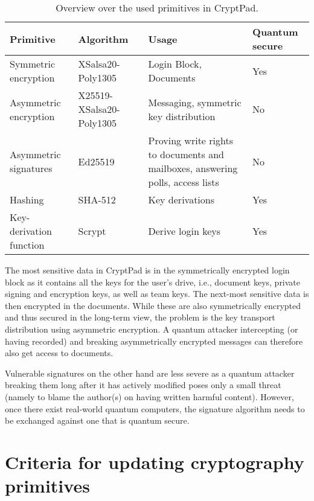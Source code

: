 \documentclass[a4paper, 11pt]{article}
\begin{document}
\begin{table}[t]
  \centering
  \caption{Overview over the used primitives in CryptPad.}
  \label{tab:overview}

  \begin{tabular}{@{}lp{1.5cm}p{3.7cm}p{1.6cm}@{}}
    \toprule
    Primitive & Algorithm & Usage & Quantum secure~\cite{Carames2020} \\
    \midrule
    Symmetric encryption    &  XSalsa20-Poly1305        & Login Block, Documents &Yes \\
    Asymmetric encryption                 & X25519-XSalsa20-Poly1305  & Messaging, symmetric key distribution            & No\\
    Asymmetric signatures                 & Ed25519                   & Proving write rights to documents and mailboxes, answering polls, access lists& No \\
    Hashing                               & SHA-512                   & Key derivations & Yes \\
    Key-derivation function         & Scrypt                    & Derive login keys & Yes \\
    \bottomrule
  \end{tabular}
\end{table}

The most sensitive data in CryptPad is in the symmetrically encrypted login block as it contains all the keys for the user's drive, i.e., document keys, private signing and encryption keys, as well as team keys.
The next-most sensitive data is then encrypted in the documents.
While these are also symmetrically encrypted and thus secured in the long-term view, the problem is the key transport distribution using asymmetric encryption.
A quantum attacker intercepting (or having recorded) and breaking asymmetrically encrypted messages can therefore also get access to documents.

Vulnerable signatures on the other hand are less severe as a quantum attacker breaking them long after it has actively modified poses only a small threat (namely to blame the author(s) on having written harmful content).
However, once there exist real-world quantum computers, the signature algorithm needs to be exchanged against one that is quantum secure.

\section{Criteria for updating cryptography primitives}
\end{document}
